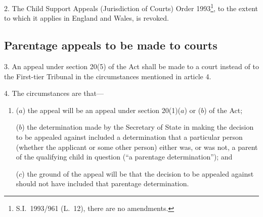 \documentclass[12pt,a4paper]{article}
\begin{document}
2.  The Child Support Appeals (Jurisdiction of Courts) Order 1993\footnote{S.I.\ 1993/961 (L.\ 12), there are no amendments.}, to the extent to which it applies in England and Wales, is revoked.

\subsection[3--5. Parentage appeals to be made to courts]{Parentage appeals to be made to courts}

3.  An appeal under section 20(5) of the Act shall be made to a court instead of to 
the First-tier Tribunal  %
in the circumstances mentioned in article 4.


\medskip

4.  The circumstances are that—
\begin{enumerate}\item[]
($a$) the appeal will be an appeal under section 20(1)($a$)  or ($b$)  of the Act;

($b$) the determination made by the Secretary of State in making the decision to be appealed against included a determination that a particular person (whether the applicant or some other person) either was, or was not, a parent of the qualifying child in question (“a parentage determination”); and

($c$) the ground of the appeal will be that the decision to be appealed against should not have included that parentage determination.
\end{enumerate}

\medskip

%
%
\end{document}
